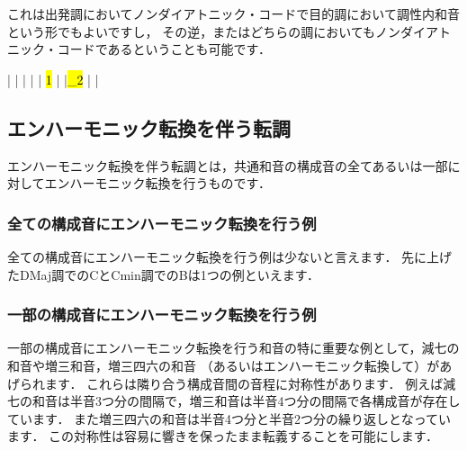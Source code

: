 \documentclass[dvipdfmx,uplatex,b5paper,openany,jbase=12Q,nomag*,textwidth-limit=44%
               ]{gachimuchi}[2020/05/05]
\begin{document}
これは出発調においてノンダイアトニック・コードで目的調において調性内和音という形でもよいですし，
その逆，またはどちらの調においてもノンダイアトニック・コードであるということも可能です．
\begin{Music}
  \generalmeter{\meterC}%
  \Startpiece
  \NOTes%
  |%
  \en\bar%
  \NOTes%
  |%
  \en\bar%
  \NOTes%
  \zchordsl{\Gnii\Min}%
  |%
  \hl{1}%
  \en\bar%
  \NOTes%
  |\hl{_2}%
  \en\bar%
  \NOTEs%
  |%
  \en\setdoublebar%
  \endpiece
\end{Music}


\subsection{エンハーモニック転換を伴う転調}
エンハーモニック転換を伴う転調とは，共通和音の構成音の全てあるいは一部に対してエンハーモニック転換を行うものです．
\subsubsection{全ての構成音にエンハーモニック転換を行う例}
全ての構成音にエンハーモニック転換を行う例は少ないと言えます．
先に上げたD\aFlat Maj調でのC\Dimt とC\aSharp min調でのB\aSharp\Dimt は1つの例といえます．

\begin{Music}[.6\linewidth]
  \nostartrule%
  \Startpiece
  \Notes%
  \en\setdoublebar{}\ignorenats\changecontext%
  \Notes%
  \en\setdoublebar
  \endpiece
\end{Music}


\subsubsection{一部の構成音にエンハーモニック転換を行う例}
一部の構成音にエンハーモニック転換を行う和音の特に重要な例として，減七の和音や増三和音，増三四六の和音
（あるいはエンハーモニック転換して\txCirc{}）があげられます．
これらは隣り合う構成音間の音程に対称性があります．
例えば減七の和音は半音3つ分の間隔で，増三和音は半音4つ分の間隔で各構成音が存在しています．
また増三四六の和音は半音4つ分と半音2つ分の繰り返しとなっています．
この対称性は容易に響きを保ったまま転義することを可能にします．
\end{document}
